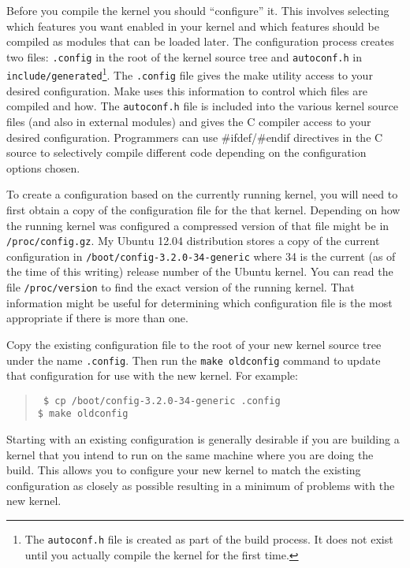 \documentclass{article}
\newcommand{\command}[1]{\texttt{#1}}    %
\newcommand{\filename}[1]{\texttt{#1}}   %
\newenvironment{commands}
  {\begin{quote} \tt}
  {\end{quote}}
\begin{document}
Before you compile the kernel you should ``configure'' it. This involves selecting which
features you want enabled in your kernel and which features should be compiled as modules that
can be loaded later. The configuration process creates two files: \filename{.config} in the root
of the kernel source tree and \filename{autoconf.h} in \filename{include/generated}\footnote{The
  \filename{autoconf.h} file is created as part of the build process. It does not exist until
  you actually compile the kernel for the first time.}. The \filename{.config} file gives the
make utility access to your desired configuration. Make uses this information to control which
files are compiled and how. The \filename{autoconf.h} file is included into the various kernel
source files (and also in external modules) and gives the C compiler access to your desired
configuration. Programmers can use \#ifdef/\#endif directives in the C source to selectively
compile different code depending on the configuration options chosen.

To create a configuration based on the currently running kernel, you will need to first obtain a
copy of the configuration file for the that kernel. Depending on how the running kernel was
configured a compressed version of that file might be in \filename{/proc/config.gz}. My Ubuntu
12.04 distribution stores a copy of the current configuration in
\filename{/boot/config-3.2.0-34-generic} where 34 is the current (as of the time of this
writing) release number of the Ubuntu kernel. You can read the file \filename{/proc/version} to
find the exact version of the running kernel. That information might be useful for determining
which configuration file is the most appropriate if there is more than one.

Copy the existing configuration file to the root of your new kernel source tree under the name
\filename{.config}. Then run the \command{make oldconfig} command to update that configuration
for use with the new kernel. For example:
\begin{commands}
\$ cp /boot/config-3.2.0-34-generic .config \\
\$ make oldconfig
\end{commands}

Starting with an existing configuration is generally desirable if you are building a kernel that
you intend to run on the same machine where you are doing the build. This allows you to
configure your new kernel to match the existing configuration as closely as possible resulting
in a minimum of problems with the new kernel.
\end{document}
